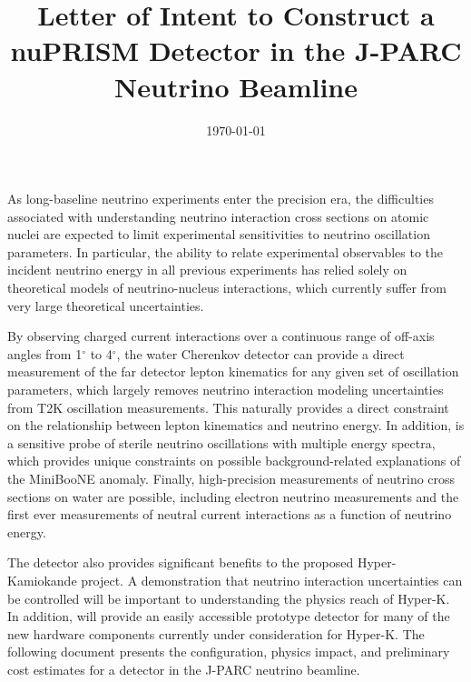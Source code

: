 \documentclass[%
reprint,
superscriptaddress,
 amsmath,amssymb,
 aps,
floatfix,
]{revtex4-1}
\begin{document}

\title{Letter of Intent to Construct a nuPRISM Detector in the J-PARC Neutrino Beamline}%



\date{ \today }  %

\maketitle


\onecolumngrid
{\small
As long-baseline neutrino experiments enter the precision era, the difficulties associated with understanding neutrino interaction cross sections on atomic nuclei are expected to limit experimental sensitivities to neutrino oscillation parameters. In particular, the ability to relate experimental observables to the incident neutrino energy in all previous experiments has relied solely on theoretical models of neutrino-nucleus interactions, which currently suffer from very large theoretical uncertainties.

By observing charged current \numu interactions over a continuous range of off-axis angles from 1$^\circ$ to 4$^\circ$, the \nuprism water Cherenkov detector can provide a direct measurement of the far detector lepton kinematics for any given set of oscillation parameters, which largely removes neutrino interaction modeling uncertainties from T2K oscillation measurements. This naturally provides a direct constraint on the relationship between lepton kinematics and neutrino energy. In addition, \nuprism is a sensitive probe of sterile neutrino oscillations with multiple energy spectra, which provides unique constraints on possible background-related explanations of the MiniBooNE anomaly. Finally, high-precision measurements of neutrino cross sections on water are possible, including electron neutrino measurements and the first ever measurements of neutral current interactions as a function of neutrino energy.

The \nuprism detector also provides significant benefits to the proposed Hyper-Kamiokande project. A demonstration that neutrino interaction uncertainties can be controlled will be important to understanding the physics reach of Hyper-K. In addition, \nuprism will provide an easily accessible prototype detector for many of the new hardware components currently under consideration for Hyper-K. The following document presents the configuration, physics impact, and preliminary cost estimates for a \nuprism detector in the J-PARC neutrino beamline.\\ \\ \\
}
\twocolumngrid
\end{document}
